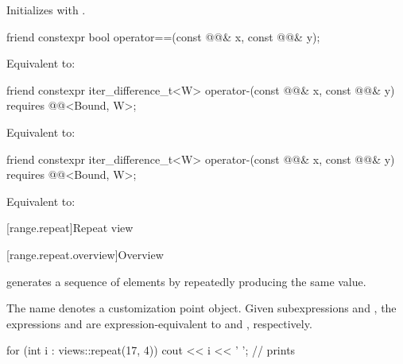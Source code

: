 \begin{itemdescr}
\pnum
\effects
Initializes  with .
\end{itemdescr}

\begin{itemdecl}
friend constexpr bool operator==(const @@& x, const @@& y);
\end{itemdecl}

\begin{itemdescr}
\pnum
\effects
Equivalent to: 
\end{itemdescr}

\begin{itemdecl}
friend constexpr iter_difference_t<W> operator-(const @@& x, const @@& y)
  requires @@<Bound, W>;
\end{itemdecl}

\begin{itemdescr}
\pnum
\effects
Equivalent to: 
\end{itemdescr}

\begin{itemdecl}
friend constexpr iter_difference_t<W> operator-(const @@& x, const @@& y)
  requires @@<Bound, W>;
\end{itemdecl}

\begin{itemdescr}
\pnum
\effects
Equivalent to: 
\end{itemdescr}

[range.repeat]{Repeat view}

[range.repeat.overview]{Overview}

\pnum
{} generates a sequence of elements
by repeatedly producing the same value.

\pnum
{}%
The name  denotes
a customization point object.
Given subexpressions  and ,
the expressions  and 
are expression-equivalent to
 and , respectively.

\pnum
\begin{example}
\begin{codeblock}
for (int i : views::repeat(17, 4))
  cout << i << ' ';
// prints 
\end{codeblock}
\end{example}

